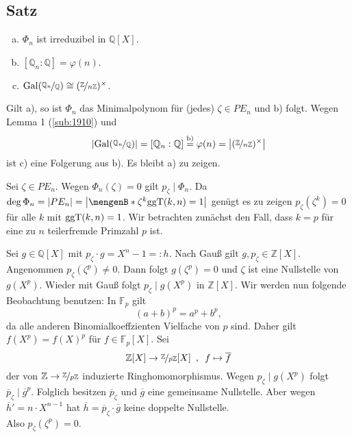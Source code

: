 \subsection[{Satz: $\Phi_n$ ist irreduzibel in $\mathds{Q}[X]$, $[\mathds{Q}_n :\mathds{Q}] = \varphi(n)$}]{Satz} %
\label{sub:1914}
\begin{enumerate}[a)]
	\item $\Phi_n$ ist irreduzibel in $\mathds{Q}[X]$.
	\item $[\mathds{Q}_n : \mathds{Q}] = \varphi(n)$.
	\item $\Gal(\nicefrac{\mathds{Q}_n}{\mathds{Q}}) \cong (\nicefrac{\mathds{Z}}{n \mathds{Z}})^\times$.
\end{enumerate}
Gilt a), so ist $\Phi_n$ das Minimalpolynom für (jedes) $\zeta \in PE_n$ und b) folgt. Wegen Lemma 1 (\ref{sub:1910}) und 
\[
	\abs*{\Gal(\nicefrac{\mathds{Q}_n}{\mathds{Q}})} = [\mathds{Q}_n : \mathds{Q}] \stackrel{\text{b)}}{=} \varphi(n) = \abs*{ (\nicefrac{\mathds{Z}}{n \mathds{Z}})^\times}  
\]
ist c) eine Folgerung aus b). Es bleibt a) zu zeigen. 

Sei $\zeta \in PE_n$. Wegen $\Phi_n(\zeta) =0$ gilt $p_\zeta \mid \Phi_n$. Da $\deg \Phi_n = \abs*{PE_n} = \abs*{\set[\zeta^k]{\ggT(k,n)=1} }  $ genügt es zu zeigen
$p_\zeta (\zeta^k)=0$ für alle $k$ mit $\ggT(k,n)=1$. Wir betrachten zunächst den Fall, dass $k=p$ für eine zu $n$ teilerfremde Primzahl $p$ ist.

Sei $g \in \mathds{Q}[X]$ mit $p_\zeta \cdot g = X^n-1 =: h$. Nach Gauß gilt $g , p_\zeta \in \mathds{Z}[X]$. Angenommen $p_\zeta (\zeta^p) \not= 0$. Dann folgt
$g(\zeta^p)=0$ und $\zeta$ ist eine Nullstelle von $g(X^p)$. Wieder mit Gauß folgt $p_\zeta \mid g(X^p)$ in $\mathds{Z}[X]$. Wir werden nun folgende Beobachtung benutzen:
In $\mathds{F}_p$ gilt 
\[
	(a+b)^p = a^p + b^p,
\]
da alle anderen Binomialkoeffzienten Vielfache von $p$ sind. Daher gilt $f(X^p) = f(X)^p$ für $f \in \mathds{F}_p[X]$. Sei
\[
	\mathds{Z}[X] \to \nicefrac{\mathds{Z}}{p \mathds{Z}}[X] \enspace, \enspace f \mapsto \overline{f} 
\]
der von $\mathds{Z} \to \nicefrac{\mathds{Z}}{p \mathds{Z}}$ induzierte Ringhomomorphismus. Wegen $p_\zeta \mid g(X^p)$ folgt $\overline{p}_\zeta \mid \overline{g}^p  $.
Folglich besitzen $\overline{p}_\zeta $ und $\overline{g}$ eine gemeinsame Nullstelle. Aber wegen $\overline{h}' = n \cdot X^{n-1} $ hat 
$\overline{h} = \overline{p}_\zeta \cdot \overline{g}$ keine doppelte Nullstelle. \light \\
Also $p_\zeta( \zeta^p)=0$.

